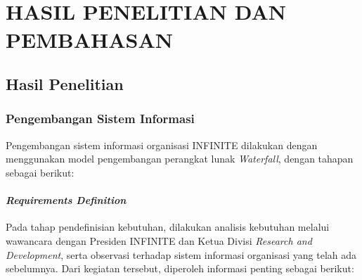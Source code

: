 
\chapter[HASIL PENELITIAN DAN PEMBAHASAN]{\\ HASIL PENELITIAN DAN PEMBAHASAN}

\section{Hasil Penelitian}

\subsection{Pengembangan Sistem Informasi}
Pengembangan sistem informasi organisasi INFINITE dilakukan dengan menggunakan model pengembangan perangkat lunak \textit{Waterfall}, dengan tahapan sebagai berikut:

\subsubsection{\textit{Requirements Definition}}

Pada tahap pendefinisian kebutuhan, dilakukan analisis kebutuhan melalui wawancara dengan Presiden INFINITE dan Ketua Divisi \textit{Research and Development}, serta observasi terhadap sistem informasi organisasi yang telah ada sebelumnya. Dari kegiatan tersebut, diperoleh informasi penting sebagai berikut:

